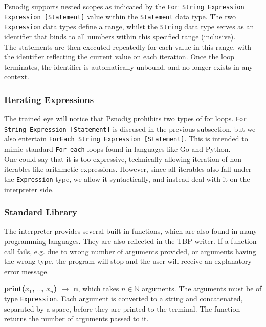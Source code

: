 Psnodig supports nested scopes as indicated by the \texttt{For String Expression Expression [Statement]} value within the \texttt{Statement} data type. The two \texttt{Expression} data types define a range, whilst the \texttt{String} data type serves as an identifier that binds to all numbers within this specified range (inclusive). \\

The statements are then executed repeatedly for each value in this range, with the identifier reflecting the current value on each iteration. Once the loop terminates, the identifier is automatically unbound, and no longer exists in any context.

\subsubsection{Iterating Expressions}

The trained eye will notice that Psnodig prohibits two types of for loops. \texttt{For String Expression [Statement]} is discused in the previous subsection, but we also entertain \texttt{ForEach String Expression [Statement]}. This is intended to mimic standard \texttt{For each}-loops found in languages like Go and Python. \\

One could say that it is too expressive, technically allowing iteration of non-iterables like arithmetic expressions. However, since all iterables also fall under the \texttt{Expression} type, we allow it syntactically, and instead deal with it on the interpreter side.

\subsubsection{Standard Library}

The interpreter provides several built-in functions, which are also found in many programming languages. They are also reflected in the TBP writer. If a function call fails, e.g. due to wrong number of arguments provided, or arguments having the wrong type, the program will stop and the user will receive an explanatory error message. \\


\textbf{print($x_{1}$, $..$, $x_{n}$) $\xrightarrow{}$ n}, which takes $n \in \mathbb{N}$ arguments. The arguments must be of type \texttt{Expression}. Each argument is converted to a string and concatenated, separated by a space, before they are printed to the terminal. The function returns the number of arguments passed to it. \\

